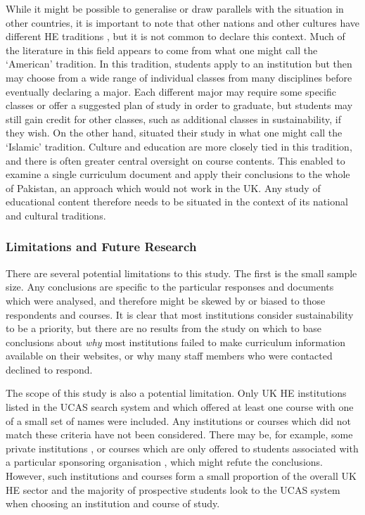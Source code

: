 While it might be possible to generalise or draw parallels with the situation in other countries, it is important to note that other nations and other cultures have different HE traditions \citep{UNESCO2023}, but it is not common to declare this context. Much of the literature in this field appears to come from what one might call the `American' tradition. In this tradition, students apply to an institution but then may choose from a wide range of individual classes from many disciplines before eventually declaring a major. Each different major may require some specific classes or offer a suggested plan of study in order to graduate, but students may still gain credit for other classes, such as additional classes in sustainability, if they wish. On the other hand, \citet{Malik2019} situated their study in what one might call the `Islamic' tradition. Culture and education are more closely tied in this tradition, and there is often greater central oversight on course contents. This enabled \citeauthor{Malik2019} to examine a single curriculum document and apply their conclusions to the whole of Pakistan, an approach which would not work in the UK. Any study of educational content therefore needs to be situated in the context of its national and cultural traditions.

\subsubsection*{Limitations and Future Research}

There are several potential limitations to this study. The first is the small sample size. Any conclusions are specific to the particular responses and documents which were analysed, and therefore might be skewed by or biased to those respondents and courses. It is clear that most institutions consider sustainability to be a priority, but there are no results from the study on which to base conclusions about \emph{why} most institutions failed to make curriculum information available on their websites, or why many staff members who were contacted declined to respond.

The scope of this study is also a potential limitation. Only UK HE institutions listed in the UCAS search system \citep{UCAS2020} and which offered at least one course with one of a small set of names were included. Any institutions or courses which did not match these criteria have not been considered. There may be, for example, some private institutions \citep{Hunt2023}, or courses which are only offered to students associated with a particular sponsoring organisation \citep{TheScholarshipHub2023}, which might refute the conclusions. However, such institutions and courses form a small proportion of the overall UK HE sector and the majority of prospective students look to the UCAS system when choosing an institution and course of study.


